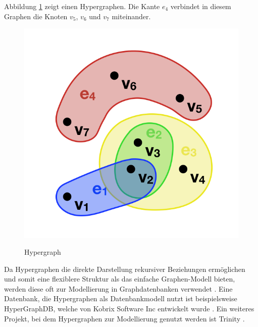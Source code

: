 Abbildung \ref{2.hyper.image} zeigt einen Hypergraphen.
Die Kante $e_{4}$ verbindet in diesem Graphen die Knoten $v_{5}$, $v_{6}$ und $v_{7}$ miteinander.
\begin{figure}[H]
\begin{center}
	\includegraphics[scale = 0.5]{./images/Hypergraph2.png}
	\label{2.hyper.image}
	\caption{Hypergraph}
\end{center}
\end{figure}
Da Hypergraphen die direkte Darstellung rekursiver Beziehungen ermöglichen und somit eine flexiblere Struktur als das einfache Graphen-Modell bieten, werden diese oft zur Modellierung in Graphdatenbanken verwendet \cite{iordanov2010hypergraphdb}\cite{flockdb}.
Eine Datenbank, die Hypergraphen als Datenbankmodell nutzt ist beispielsweise HyperGraphDB, welche von Kobrix Software Inc entwickelt wurde \cite{iordanov2010hypergraphdb}.
Ein weiteres Projekt, bei dem Hypergraphen zur Modellierung genutzt werden ist Trinity \cite{shao2013trinity}.

